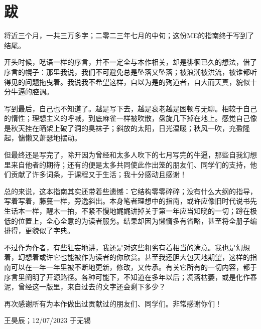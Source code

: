 \chapter{跋}
将近三个月，一共三万多字；二零二三年七月的中旬；这份ME的指南终于写到了结尾。

开头时候，呓语一样的序言，并不一定全与本作相关，却是徘徊已久的想法，借了序言的幌子：那里我说，我们不可避免总是坠落又坠落；被浪潮被洪流，被谁都听得见的问题拖曳着。我说我不希望这样，自以为是的殉道者，自大而天真，貌似十分牛逼的腔调。

写到最后，自己也不知道了。越是写下去，越是衰老越是困顿与无聊。相较于自己的惰性；理想主义的呼喊，到底麻雀一样被吹散，盘旋几下掉在地上。感觉自己像是秋天挂在晒架上破了洞的臭袜子；斜放的太阳，日光温暖；秋风一吹，充盈隆起，慵懒又萧瑟地摆动。

但最终还是写完了，除开因为曾经和太多人吹下的七月写完的牛逼，那些自我幻想里来自他者的期待；还有的便是太多共同使此作出笼的朋友们、同学们的支持，他们贡献了许多词条，于课程又于生活；我十分感动且感谢！

总的来说，这本指南其实还带着些遗憾：它结构零零碎碎；没有什么大纲的指导，写着写着，藤蔓一样，旁逸斜出。本身笔者理想中的指南，或许应像旧时代说书先生话本一样，醒木一拍，不紧不慢地娓娓讲掉关于第一年应当知晓的一切；蹲在极低的位置上，全心全意的为读者服务。结果却因为懒惰多有省略，甚至将全册子编排得，更貌似了字典。

不过作为作者，有些狂妄地讲，我还是对这些粗劣有着相当的满意。我也是幻想着，幻想着或许它也能被作为读者的你欣赏。甚至我还胆大包天地期望，这样的指南可以在一年一年里被不断地更新，修改，又传承。有关它所有的一切内容，都于序言里阐明了开源路径。各种可能下，不知道在多年以后；凋落枯萎，或是化作春泥，曾经这一版里，来自过去的文字还会剩下多少？

再次感谢所有为本作做出过贡献过的朋友们、同学们。非常感谢你们！

\begin{flushright}
王昊辰；12/07/2023 于无锡
\end{flushright}